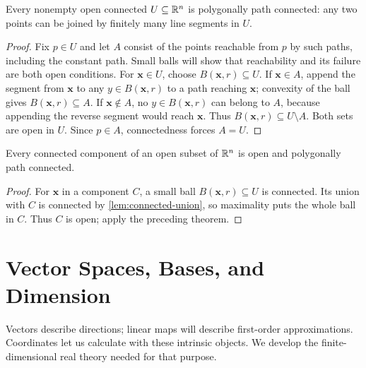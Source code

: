 \begin{theorem}
\label{thm:open-connected-polygonal}
Every nonempty open connected $U\subseteq\mathbb{R}^n$ is polygonally path
connected: any two points can be joined by finitely many line segments in $U$.
\end{theorem}
\begin{proof}
Fix $p\in U$ and let $A$ consist of the points reachable from $p$ by such
paths, including the constant path. Small balls will show that reachability
and its failure are both open conditions. For $\mathbf{x}\in U$, choose
$B(\mathbf{x},r)\subseteq U$. If $\mathbf{x}\in A$, append the segment from $\mathbf{x}$ to any
$y\in B(\mathbf{x},r)$ to a path reaching $\mathbf{x}$; convexity of the ball gives
$B(\mathbf{x},r)\subseteq A$. If $\mathbf{x}\notin A$, no $y\in B(\mathbf{x},r)$ can belong to
$A$, because appending the reverse segment would reach $\mathbf{x}$. Thus
$B(\mathbf{x},r)\subseteq U\setminus A$. Both sets are open in $U$.
Since $p\in A$, connectedness forces $A=U$.
\end{proof}
\begin{corollary}\label{cor:open-components}
Every connected component of an open subset of $\mathbb{R}^n$ is open and
polygonally path connected.
\end{corollary}
\begin{proof}
For $\mathbf{x}$ in a component $C$, a small ball $B(\mathbf{x},r)\subseteq U$ is connected.
Its union with $C$ is connected by \cref{lem:connected-union}, so maximality
puts the whole ball in $C$. Thus $C$ is open; apply the preceding theorem.
\end{proof}


\section{Vector Spaces, Bases, and Dimension}
\label{sec:linear-foundations}
Vectors describe directions; linear maps will describe first-order
approximations. Coordinates let us calculate with these intrinsic objects.
We develop the finite-dimensional real theory needed for that purpose.


